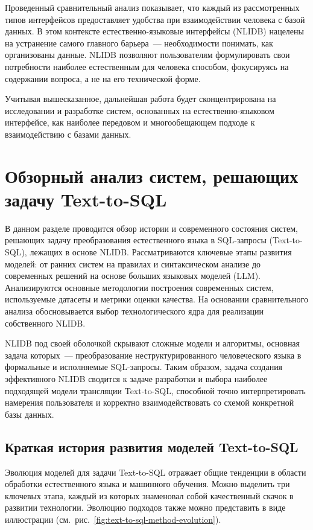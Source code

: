Проведенный сравнительный анализ показывает, что каждый из рассмотренных типов интерфейсов предоставляет
удобства при взаимодействии человека с базой данных.
В этом контексте естественно-языковые интерфейсы (NLIDB) нацелены на устранение самого главного барьера~--- необходимости понимать,
как организованы данные. NLIDB позволяют пользователям формулировать свои потребности наиболее
естественным для человека способом, фокусируясь на содержании вопроса, а не на его технической форме.

Учитывая вышесказанное, дальнейшая работа будет сконцентрирована на исследовании и разработке систем,
основанных на естественно-языковом интерфейсе, как наиболее передовом и многообещающем подходе
к взаимодействию с базами данных.




\section{Обзорный анализ систем, решающих задачу Text-to-SQL}
\begin{annotation}
      В данном разделе проводится обзор истории и современного состояния систем,
      решающих задачу преобразования естественного языка в SQL-запросы (Text-to-SQL),
      лежащих в основе NLIDB. Рассматриваются ключевые этапы развития моделей:
      от ранних систем на правилах и синтаксическом анализе до современных решений на основе
      больших языковых моделей (LLM). Анализируются основные методологии построения современных систем,
      используемые датасеты и метрики оценки качества. На основании сравнительного анализа
      обосновывается выбор технологического ядра для реализации собственного NLIDB.
\end{annotation}

NLIDB под своей оболочкой скрывают сложные модели и алгоритмы, основная задача которых~--- преобразование
неструктурированного человеческого языка в формальные и исполняемые SQL-запросы. Таким образом, задача
создания эффективного NLIDB сводится к задаче разработки и выбора наиболее подходящей модели трансляции Text-to-SQL,
способной точно интерпретировать намерения пользователя и корректно взаимодействовать со схемой конкретной базы данных.

\subsection{Краткая история развития моделей Text-to-SQL}

Эволюция моделей для задачи Text-to-SQL отражает общие тенденции в области обработки естественного языка и
машинного обучения. Можно выделить три ключевых этапа, каждый из которых знаменовал собой качественный
скачок в развитии технологии. Эволюцию подходов также можно представить в виде иллюстрации
(см.~рис.~\ref{fig:text-to-sql-method-evolution}).

